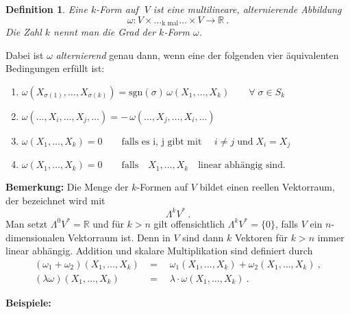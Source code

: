 \documentclass[12pt,a4paper]{article}
\def\R{\mathbb{R}}
\def\sgn{\mathrm{sgn}}
\newtheorem{Definition}[Lemma]{Definition}
\begin{document}
\begin{Definition}
Eine {\em $k$-Form} auf $\;V$ ist eine multilineare, alternierende Abbildung
$$
\omega : V \times \ldots_{\mbox{k mal}}\ldots \times V \longrightarrow \R \ .
$$
Die Zahl $k$ nennt man die Grad der $k$-Form $\omega$.
\end{Definition}

\bigskip

Dabei ist $\omega$ {\it alternierend} genau dann, wenn eine der folgenden vier \"aquivalenten
Bedingungen erf\"ullt ist:
\begin{enumerate}
\item
$\omega(X_{\sigma(1)}, \ldots, X_{\sigma(k)}) = \sgn(\sigma) \,\omega (X_1,
\ldots, X_k) \qquad \forall \; \sigma \in S_k$
\item
$\omega( \ldots, X_i, \ldots, X_j, \ldots) = - \, \omega (\ldots, X_j, \ldots, X_i, \ldots)$
\item
$\omega (X_1, \ldots, X_k ) = 0 \qquad \mbox{falls es i, j gibt mit }\quad i \neq j \;\mbox{und}\; X_i = X_j$
\item
$\omega (X_1, \ldots, X_k ) = 0 \qquad \mbox{falls} \quad X_1, \ldots, X_k \quad \mbox{linear abh\"angig sind.}$
\end{enumerate}

\bigskip

{\bf Bemerkung:} Die Menge der $k$-Formen auf $V$ bildet einen reellen Vektorraum, der bezeichnet wird
mit
$$
\Lambda^k V^* \ .
$$
Man setzt $\Lambda^0 V^* = \R$ und f\"ur $k >n$ gilt offensichtlich $\Lambda^k V^* = \{0\}$, falls $V$ ein
$n$-dimensionalen Vektorraum ist.
Denn in $V$ sind dann $k$ Vektoren f\"ur $k>n$ immer linear abh\"angig.
Addition und skalare Multiplikation sind definiert durch
$$
\begin{array}{rl}
(\omega_1 + \omega_2)(X_1, \ldots, X_k) &= \quad \omega_1(X_1, \ldots, X_k) + \omega_2(X_1, \ldots, X_k) \ ,
\\[1.5ex]
(\lambda \omega)(X_1, \ldots, X_k) & = \quad \lambda \cdot \omega(X_1, \ldots, X_k) \ .
\end{array}
$$

\bigskip

{\bf Beispiele:}
\end{document}
